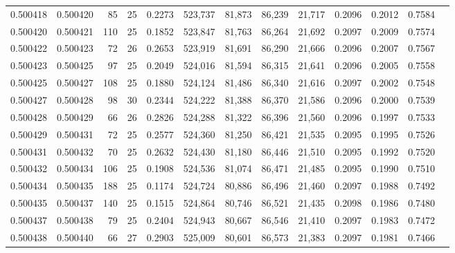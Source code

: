 \begin{tabular}{rrrrrrrrrrrrr}
0.500418 & 0.500420 &  85 &  25 &                                     0.2273 & 523,737 &  81,873 &  86,239 &  21,717 & 0.2096 & 0.2012 & 0.7584 \\
0.500420 & 0.500421 & 110 &  25 &                                     0.1852 & 523,847 &  81,763 &  86,264 &  21,692 & 0.2097 & 0.2009 & 0.7574 \\
0.500422 & 0.500423 &  72 &  26 &                                     0.2653 & 523,919 &  81,691 &  86,290 &  21,666 & 0.2096 & 0.2007 & 0.7567 \\
0.500423 & 0.500425 &  97 &  25 &                                     0.2049 & 524,016 &  81,594 &  86,315 &  21,641 & 0.2096 & 0.2005 & 0.7558 \\
0.500425 & 0.500427 & 108 &  25 &                                     0.1880 & 524,124 &  81,486 &  86,340 &  21,616 & 0.2097 & 0.2002 & 0.7548 \\
0.500427 & 0.500428 &  98 &  30 &                                     0.2344 & 524,222 &  81,388 &  86,370 &  21,586 & 0.2096 & 0.2000 & 0.7539 \\
0.500428 & 0.500429 &  66 &  26 &                                     0.2826 & 524,288 &  81,322 &  86,396 &  21,560 & 0.2096 & 0.1997 & 0.7533 \\
0.500429 & 0.500431 &  72 &  25 &                                     0.2577 & 524,360 &  81,250 &  86,421 &  21,535 & 0.2095 & 0.1995 & 0.7526 \\
0.500431 & 0.500432 &  70 &  25 &                                     0.2632 & 524,430 &  81,180 &  86,446 &  21,510 & 0.2095 & 0.1992 & 0.7520 \\
0.500432 & 0.500434 & 106 &  25 &                                     0.1908 & 524,536 &  81,074 &  86,471 &  21,485 & 0.2095 & 0.1990 & 0.7510 \\
0.500434 & 0.500435 & 188 &  25 &                                     0.1174 & 524,724 &  80,886 &  86,496 &  21,460 & 0.2097 & 0.1988 & 0.7492 \\
0.500435 & 0.500437 & 140 &  25 &                                     0.1515 & 524,864 &  80,746 &  86,521 &  21,435 & 0.2098 & 0.1986 & 0.7480 \\
0.500437 & 0.500438 &  79 &  25 &                                     0.2404 & 524,943 &  80,667 &  86,546 &  21,410 & 0.2097 & 0.1983 & 0.7472 \\
0.500438 & 0.500440 &  66 &  27 &                                     0.2903 & 525,009 &  80,601 &  86,573 &  21,383 & 0.2097 & 0.1981 & 0.7466 \\

\end{tabular}
